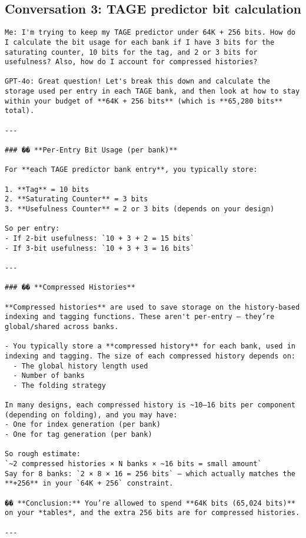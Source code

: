 \documentclass[11pt]{article}
\begin{document}
\subsection{Conversation 3: TAGE predictor bit calculation}
\begin{verbatim}
Me: I'm trying to keep my TAGE predictor under 64K + 256 bits. How do I calculate the bit usage for each bank if I have 3 bits for the saturating counter, 10 bits for the tag, and 2 or 3 bits for usefulness? Also, how do I account for compressed histories?

GPT-4o: Great question! Let's break this down and calculate the storage used per entry in each TAGE bank, and then look at how to stay within your budget of **64K + 256 bits** (which is **65,280 bits** total).

---

### �� **Per-Entry Bit Usage (per bank)**

For **each TAGE predictor bank entry**, you typically store:

1. **Tag** = 10 bits
2. **Saturating Counter** = 3 bits
3. **Usefulness Counter** = 2 or 3 bits (depends on your design)

So per entry:
- If 2-bit usefulness: `10 + 3 + 2 = 15 bits`
- If 3-bit usefulness: `10 + 3 + 3 = 16 bits`

---

### �� **Compressed Histories**

**Compressed histories** are used to save storage on the history-based indexing and tagging functions. These aren't per-entry — they’re global/shared across banks.

- You typically store a **compressed history** for each bank, used in indexing and tagging. The size of each compressed history depends on:
  - The global history length used
  - Number of banks
  - The folding strategy

In many designs, each compressed history is ~10–16 bits per component (depending on folding), and you may have:
- One for index generation (per bank)
- One for tag generation (per bank)

So rough estimate:
`~2 compressed histories × N banks × ~16 bits = small amount`
Say for 8 banks: `2 × 8 × 16 = 256 bits` — which actually matches the **+256** in your `64K + 256` constraint.

�� **Conclusion:** You’re allowed to spend **64K bits (65,024 bits)** on your *tables*, and the extra 256 bits are for compressed histories.

---


\end{verbatim}
\end{document}
